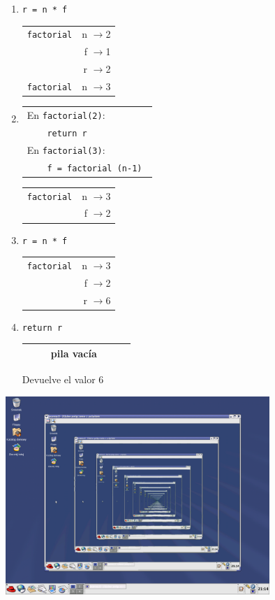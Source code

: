 \begin{enumerate}
\item  \verb|r = n * f                 |
	\begin{tabular}{r|r|}
	\hline
	\verb|factorial|&n $\rightarrow$2\\
	  &f $\rightarrow$1\\
	  &r $\rightarrow$2\\
	\hline
	\hline
	\verb|factorial|&n $\rightarrow$3\\
	\hline
	\end{tabular}

\item
\begin{tabular}{l}
En \lstinline!factorial(2)!: \\ \verb|    return r| \\
En \lstinline!factorial(3)!: \\ \verb|    f = factorial (n-1) |
\end{tabular}
	\begin{tabular}{r|r|}
	\hline
	\verb|factorial|&n $\rightarrow$3\\
	&f $\rightarrow$2\\
	\hline
	\end{tabular}

\item  \verb|r = n * f                 |
	\begin{tabular}{r|r|}
	\hline
	\verb|factorial|&n $\rightarrow$3\\
	  &f $\rightarrow$2\\
	  &r $\rightarrow$6\\
	\hline
	\end{tabular}

\item  \verb|return r                  |
	\begin{tabular}{r|r|}
	\hline
	\verb!    ! pila vacía \verb!   ! \\
	\hline
	\end{tabular}
	\hspace{0.2cm} Devuelve el valor $6$
\end{enumerate}

\begin{minipage}{\linewidth}
\centering%
\includegraphics[width=10cm]{graficos/recursive}
%
\label{fig:redhat_recursivo}%
\end{minipage}


